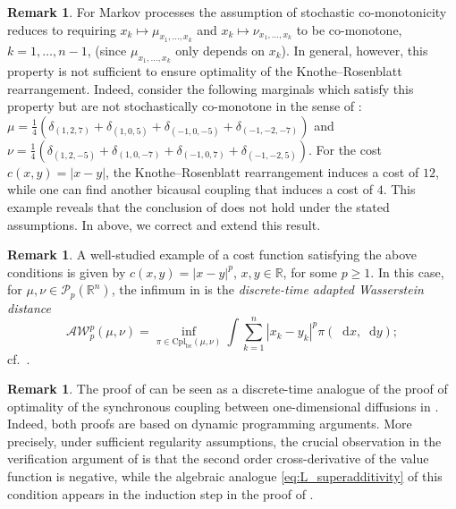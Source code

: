 \documentclass[oneside]{amsart}
\theoremstyle{definition}
\newtheorem{remark}[theorem]{Remark}
\newcommand{\AW}{\mathcal A\mathcal W}
\newcommand{\R}{\mathbb R}
\newcommand{\Pc}{\mathcal P}
\newcommand{\cpl}{\mathrm{Cpl}}
\newcommand{\cplba}{\cpl_{\mathrm{bc}}}
\newcommand{\D}{\mathop{}\!\mathrm{d}}
\def\R{{\mathbb R}}
\numberwithin{equation}{section}
\begin{document}
\begin{remark}\label{rem:stoch-mono}
	For Markov processes the assumption of stochastic co-monotonicity reduces to requiring $x_k\mapsto\mu_{x_1,\dots,x_k}$ and $x_k\mapsto\nu_{x_1,\dots,x_k}$ to be co-monotone, $k=1,\dots,n-1$, (since $\mu_{x_1,\dots,x_k}$ only depends on $x_k$). 
	In general, however, this property is not sufficient to ensure optimality of the Knothe--Rosenblatt rearrangement. 
	Indeed, consider the following marginals which satisfy this property but are not stochastically co-monotone in the sense of :
	$\mu=\frac{1}{4}(\delta_{(1,2,7)}+\delta_{(1,0,5)}+\delta_{(-1,0,-5)}+\delta_{(-1,-2,-7)})$
	and 
	$\nu=\frac{1}{4}(\delta_{(1,2,-5)}+\delta_{(1,0,-7)}+\delta_{(-1,0,7)}+\delta_{(-1,-2,5)})$.
	For the cost $c(x,y)=|x-y|$, the Knothe--Rosenblatt rearrangement induces a cost of $12$, while one can find another bicausal coupling that induces a cost of $4$.
	This example reveals that the conclusion of \cite[Proposition~5.3]{BaBeLiZa17} does not hold under the stated assumptions. In  above, we correct and extend this result.
\end{remark}



\begin{remark}
	A well-studied example of a cost function satisfying the above conditions is given by $c(x,y) = |x-y|^p$, $x,y\in \R$, for some $p \geq 1$. In this case, for $\mu, \nu \in \Pc_p(\R^n)$, the infimum in  is the \emph{discrete-time adapted Wasserstein distance}
	\begin{equation}
		\AW_p^p(\mu, \nu) = \inf_{\pi \in \cplba(\mu, \nu)} \int \sum_{k = 1}^n \!\left | x_k - y_k \right |^p \pi(\D x, \D y);
	\end{equation}
	cf.~\cite[Equation~(6)]{BaBaBeEd19b}.
\end{remark}

\begin{remark}\label{rem:kr-dpp-proof}
	The proof of  can be seen as a discrete-time analogue of the proof of optimality of the synchronous coupling between one-dimensional diffusions in \cite{BiTa19}. Indeed, both proofs are based on dynamic programming arguments.
	More precisely, under sufficient regularity assumptions, the crucial observation in the verification argument of \cite{BiTa19} is that the second order cross-derivative of the value function is negative, while the algebraic analogue \eqref{eq:L_superadditivity} of this condition appears in the induction step in the proof of .
\end{remark}
	
\end{document}
